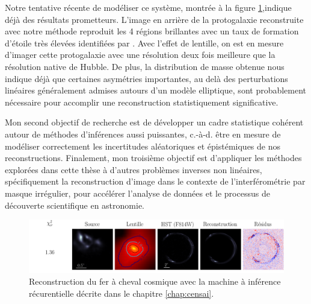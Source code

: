 Notre tentative récente de modéliser ce système, montrée à la figure \ref{fig:horseshoe},indique  
déjà des résultats prometteurs. L'image en arrière de la protogalaxie reconstruite avec notre méthode 
reproduit les 4 régions brillantes avec un taux de formation d'étoile très élevées identifiées par \citet{James2018}. 
Avec l'effet de lentille, on est en mesure d'imager cette protogalaxie avec une résolution deux fois meilleure que la 
résolution native de Hubble. De plus, la distribution de masse obtenue nous indique déjà que certaines asymétries importantes, 
au delà des perturbations linéaires généralement admises autours d'un modèle elliptique,
sont probablement nécessaire pour accomplir une reconstruction statistiquement significative.

Mon second objectif de recherche est de développer un cadre statistique cohérent autour de méthodes 
d'inférences aussi puissantes, c.-à-d. être en mesure de modéliser correctement les incertitudes aléatoriques et épistémiques 
de nos reconstructions. Finalement, mon troisième objectif est d'appliquer les méthodes explorées dans cette thèse à d'autres problèmes 
inverses non linéaires, spécifiquement la reconstruction d'image dans le contexte de l'interférométrie par masque irrégulier, 
pour accélérer l'analyse de données et le processus de découverte scientifique en astronomie.


\begin{figure}[H]
        \centering
        \includegraphics[width=\textwidth]{figures/horseshoe_pred2}
        \caption{Reconstruction du fer à cheval cosmique avec la machine à inférence récurentielle 
        décrite dans le chapitre \ref{chap:censai}.}
        \label{fig:horseshoe}
\end{figure}

